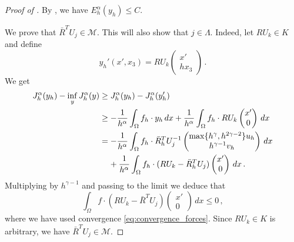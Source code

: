 \documentclass{article}
\theoremstyle{plain}
\theoremstyle{plain}
\theoremstyle{plain}
\theoremstyle{plain}
\theoremstyle{plain}
\theoremstyle{definition}
\theoremstyle{definition}
\begin{document}
\begin{proof}[Proof of ]
	By , we have $E_h^\alpha(y_h) \leq C$. 
	
	We prove that $\bar R^TU_j \in \mathcal{M}$. This will also show that $j \in \Lambda$. Indeed, let $RU_k \in K$ and define
	\[
		y_h'(x', x_3) = RU_k \begin{pmatrix}
		x' \\ hx_3
		\end{pmatrix} \,.
	\]
	We get
	\begin{equation}\label{eq:minimization_forces_eq_1}
		\begin{aligned}
			J_h^\alpha(y_h) - \inf_y J_h^\alpha(y) & \geq J_h^\alpha(y_h) - J_h^\alpha(y_h') \\ 
			& \geq -\dfrac{1}{h^\alpha}\int_\Omega f_h \cdot y_h \, dx + \dfrac{1}{h^\alpha}\int_\Omega f_h \cdot RU_k \begin{pmatrix}
				x' \\ 0
			\end{pmatrix}
			\, dx\\
			& = - \dfrac{1}{h^\alpha} \int_\Omega f_h \cdot \bar R_h^TU_j^{-1}\begin{pmatrix}
				\max\{h^\gamma, h^{2\gamma - 2}\}u_h \\ h^{\gamma - 1} v_h
			\end{pmatrix} \, dx\\
			& \hphantom{=} \, \, + \dfrac{1}{h^\alpha} \int_\Omega f_h \cdot (RU_k - \bar R_h^TU_j)\begin{pmatrix}
			x' \\ 0
			\end{pmatrix} \, dx \,.
		\end{aligned}
	\end{equation}
	Multiplying by $h^{\gamma - 1}$ and passing to the limit we deduce that
	\[
		\int_\Omega f \cdot (RU_k - \bar R^TU_j)\begin{pmatrix}
		x' \\ 0
		\end{pmatrix} \, dx \leq 0 \,,
	\]
	where we have used convergence \eqref{eq:convergence_forces}.
	Since $RU_k \in K$ is arbitrary, we have $\bar R^TU_j \in \mathcal{M}$. 
	

\end{proof}
\end{document}

